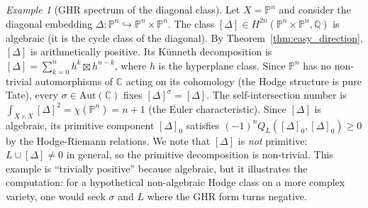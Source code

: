 \documentclass[aps,prd,twocolumn,superscriptaddress,nofootinbib]{revtex4-2}
\theoremstyle{definition}
\theoremstyle{remark}
\newtheorem{example}[theorem]{Example}
\begin{document}
\begin{example}[GHR spectrum of the diagonal class]
\label{ex:diagonal}
Let $X = \mathbb{P}^n$ and consider the diagonal embedding $\Delta: \mathbb{P}^n \hookrightarrow \mathbb{P}^n \times \mathbb{P}^n$. The class $[\Delta] \in H^{2n}(\mathbb{P}^n \times \mathbb{P}^n, \mathbb{Q})$ is algebraic (it is the cycle class of the diagonal). By Theorem~\ref{thm:easy_direction}, $[\Delta]$ is arithmetically positive. Its K\"unneth decomposition is $[\Delta] = \sum_{k=0}^n h^k \boxtimes h^{n-k}$, where $h$ is the hyperplane class. Since $\mathbb{P}^n$ has no non-trivial automorphisms of $\mathbb{C}$ acting on its cohomology (the Hodge structure is pure Tate), every $\sigma \in \mathrm{Aut}(\mathbb{C})$ fixes $[\Delta]^\sigma = [\Delta]$. The self-intersection number is $\int_{X \times X} [\Delta]^2 = \chi(\mathbb{P}^n) = n + 1$ (the Euler characteristic). Since $[\Delta]$ is algebraic, its primitive component $[\Delta]_0$ satisfies $(-1)^n Q_L([\Delta]_0, [\Delta]_0) \geq 0$ by the Hodge-Riemann relations. We note that $[\Delta]$ is \emph{not} primitive: $L \cup [\Delta] \neq 0$ in general, so the primitive decomposition is non-trivial. This example is ``trivially positive'' because algebraic, but it illustrates the computation: for a hypothetical non-algebraic Hodge class on a more complex variety, one would seek $\sigma$ and $L$ where the GHR form turns negative.
\end{example}
\end{document}
